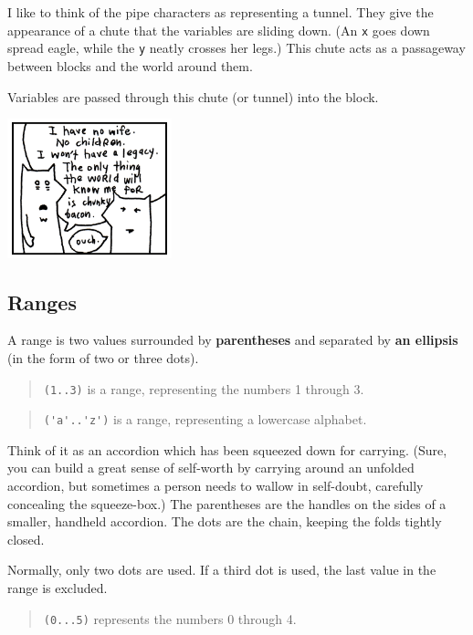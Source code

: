 \documentclass[10pt,twoside]{report}
\begin{document}
I like to think of the pipe characters as representing a tunnel.  They
give the appearance of a chute that the variables are sliding down.
(An \lstinline[breaklines=true]|x| goes down spread eagle, while the
\lstinline[breaklines=true]|y| neatly crosses her legs.)  This chute
acts as a passageway between blocks and the world around them.

Variables are passed through this chute (or tunnel) into the block.

	\includegraphics[width=0.3575\textwidth]{cache/14.png}




\subsection{Ranges}



A range is two values surrounded by {\bf parentheses} and separated by
{\bf an ellipsis} (in the form of two or three dots).

\begin{quote}
\lstinline[breaklines=true]|(1..3)| is a range, representing the
numbers 1 through 3.\end{quote}


\begin{quote}
\lstinline[breaklines=true]|('a'..'z')| is a range, representing a
lowercase alphabet.\end{quote}


Think of it as an accordion which has been squeezed down for carrying.
(Sure, you can build a great sense of self-worth by carrying around an
unfolded accordion, but sometimes a person needs to wallow in
self-doubt, carefully concealing the squeeze-box.)  The parentheses
are the handles on the sides of a smaller, handheld accordion.  The
dots are the chain, keeping the folds tightly closed.

Normally, only two dots are used.  If a third dot is used, the last
value in the range is excluded.

\begin{quote}
\lstinline[breaklines=true]|(0...5)| represents the numbers 0 through
4.\end{quote}
\end{document}
